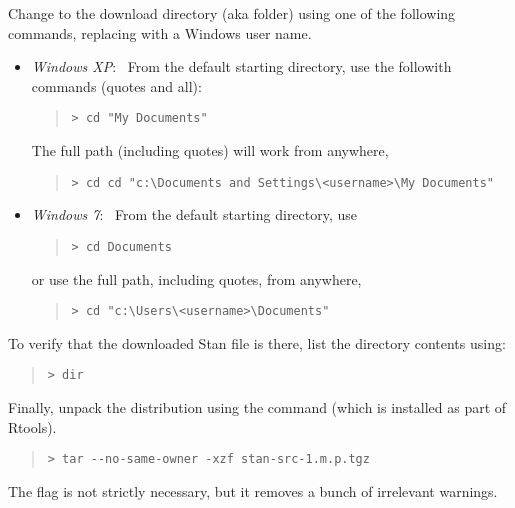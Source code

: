 Change to the download directory (aka folder) using one of the
following commands, replacing  with
a Windows user name.
%
\begin{itemize}
\item \emph{Windows XP}: \ From the default starting directory, use
the followith commands (quotes and all):
\begin{quote}
\begin{Verbatim}[fontshape=sl]
> cd "My Documents"
\end{Verbatim}
\end{quote}
%
The full path (including quotes) will work from anywhere,
\begin{quote}
\begin{Verbatim}[fontshape=sl]
> cd cd "c:\Documents and Settings\<username>\My Documents"
\end{Verbatim}
\end{quote}
\item \emph{Windows 7}:  \  From the default starting directory, use
\begin{quote}
\begin{Verbatim}[fontshape=sl]
> cd Documents
\end{Verbatim}
\end{quote} 
or use the full path, including quotes, from anywhere,
\begin{quote}
\begin{Verbatim}[fontshape=sl]
> cd "c:\Users\<username>\Documents"
\end{Verbatim}
\end{quote}
\end{itemize}
%
To verify that the downloaded Stan  file is there,
list the directory contents using:
%
\begin{quote}
\begin{Verbatim}[fontshape=sl]
> dir
\end{Verbatim}
\end{quote}

Finally, unpack the distribution using the  command (which is
installed as part of Rtools).
%
\begin{quote}
\begin{Verbatim}[fontshape=sl]
> tar --no-same-owner -xzf stan-src-1.m.p.tgz 
\end{Verbatim}
\end{quote}
%
The  flag is not strictly necessary,
but it removes a bunch of irrelevant warnings.



